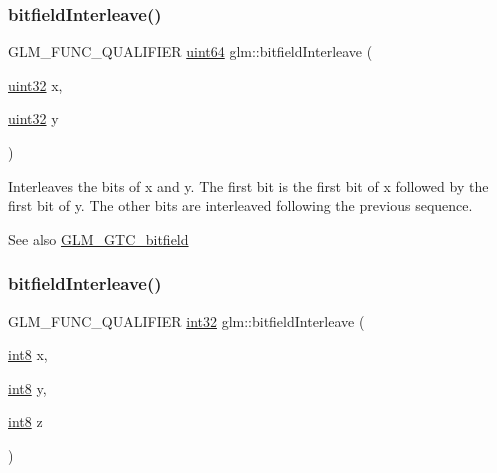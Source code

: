 \subsubsection{\texorpdfstring{bitfield\+Interleave()}{bitfieldInterleave()}\hspace{0.1cm}{\footnotesize\ttfamily [6/16]}}
{\footnotesize\ttfamily G\+L\+M\+\_\+\+F\+U\+N\+C\+\_\+\+Q\+U\+A\+L\+I\+F\+I\+ER \hyperlink{group__gtc__type__precision_gae3632bf9b37da66233d78930dd06378a}{uint64} glm\+::bitfield\+Interleave (\begin{DoxyParamCaption}\item[{\hyperlink{group__gtc__type__precision_ga202b6a53c105fcb7e531f9b443518451}{uint32}}]{x,  }\item[{\hyperlink{group__gtc__type__precision_ga202b6a53c105fcb7e531f9b443518451}{uint32}}]{y }\end{DoxyParamCaption})}

Interleaves the bits of x and y. The first bit is the first bit of x followed by the first bit of y. The other bits are interleaved following the previous sequence.

\begin{DoxySeeAlso}{See also}
\hyperlink{group__gtc__bitfield}{G\+L\+M\+\_\+\+G\+T\+C\+\_\+bitfield} 
\end{DoxySeeAlso}
\mbox{\label{group__gtc__bitfield_ga6dee2ce1c45805063bb7fc5f6fd8f5ca}} 
\subsubsection{\texorpdfstring{bitfield\+Interleave()}{bitfieldInterleave()}\hspace{0.1cm}{\footnotesize\ttfamily [7/16]}}
{\footnotesize\ttfamily G\+L\+M\+\_\+\+F\+U\+N\+C\+\_\+\+Q\+U\+A\+L\+I\+F\+I\+ER \hyperlink{group__gtc__type__precision_ga632d8b25f6b61659f39ea4321fab92a4}{int32} glm\+::bitfield\+Interleave (\begin{DoxyParamCaption}\item[{\hyperlink{group__gtc__type__precision_ga96254f9c1c4506fc8eb5cf3301ce8565}{int8}}]{x,  }\item[{\hyperlink{group__gtc__type__precision_ga96254f9c1c4506fc8eb5cf3301ce8565}{int8}}]{y,  }\item[{\hyperlink{group__gtc__type__precision_ga96254f9c1c4506fc8eb5cf3301ce8565}{int8}}]{z }\end{DoxyParamCaption})}


